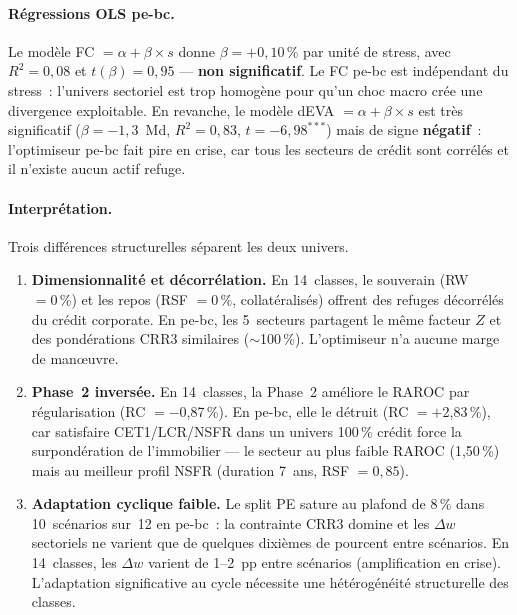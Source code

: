 \documentclass[10pt, a4paper, oneside]{report}
\theoremstyle{definition}
\begin{document}
\paragraph{Régressions OLS pe-bc.}
Le modèle FC $= \alpha + \beta \times s$ donne $\beta = +0{,}10\,\%$ par unité de stress, avec $R^2 = 0{,}08$ et $t(\beta) = 0{,}95$ --- \textbf{non significatif}. Le FC pe-bc est indépendant du stress~: l'univers sectoriel est trop homogène pour qu'un choc macro crée une divergence exploitable. En revanche, le modèle dEVA $= \alpha + \beta \times s$ est très significatif ($\beta = -1{,}3$~Md, $R^2 = 0{,}83$, $t = -6{,}98^{***}$) mais de signe \textbf{négatif}~: l'optimiseur pe-bc fait pire en crise, car tous les secteurs de crédit sont corrélés et il n'existe aucun actif refuge.

\paragraph{Interprétation.}
Trois différences structurelles séparent les deux univers.
%
\begin{enumerate}[nosep]
  \item \textbf{Dimensionnalité et décorrélation.} En 14~classes, le souverain (RW $= 0\,\%$) et les repos (RSF $= 0\,\%$, collatéralisés) offrent des refuges décorrélés du crédit corporate. En pe-bc, les 5~secteurs partagent le même facteur $Z$ et des pondérations CRR3 similaires ($\sim$100\,\%). L'optimiseur n'a aucune marge de manœuvre.
  \item \textbf{Phase~2 inversée.} En 14~classes, la Phase~2 améliore le RAROC par régularisation (RC $= -$0{,}87\,\%). En pe-bc, elle le détruit (RC $= +$2{,}83\,\%), car satisfaire CET1/LCR/NSFR dans un univers 100\,\% crédit force la surpondération de l'immobilier --- le secteur au plus faible RAROC (1{,}50\,\%) mais au meilleur profil NSFR (duration 7~ans, RSF $= 0{,}85$).
  \item \textbf{Adaptation cyclique faible.} Le split PE sature au plafond de 8\,\% dans 10~scénarios sur~12 en pe-bc~: la contrainte CRR3 domine et les $\Delta w$ sectoriels ne varient que de quelques dixièmes de pourcent entre scénarios. En 14~classes, les $\Delta w$ varient de 1--2~pp entre scénarios (amplification en crise). L'adaptation significative au cycle nécessite une hétérogénéité structurelle des classes.
\end{enumerate}
\end{document}
